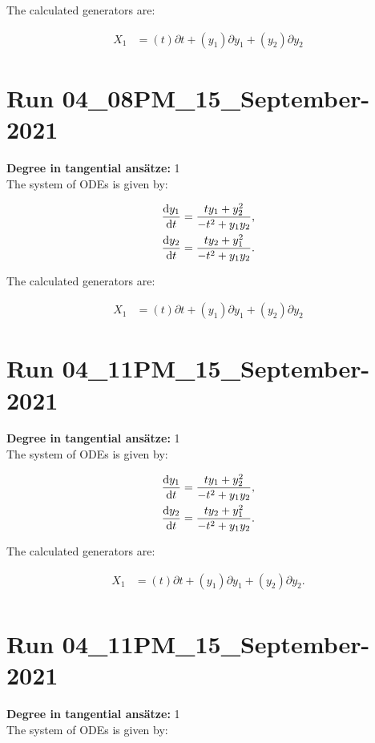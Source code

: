 \noindent The calculated generators are:

\begin{align*}
X_{1}&=\left( t \right)\partial t+\left( y_{1} \right)\partial y_{1}+\left( y_{2} \right)\partial y_{2}\end{align*}
\section*{Run 04\_08PM\_15\_September-2021}
\textbf{Degree in tangential ansätze:}	1\\
The system of ODEs is given by:

\begin{align*}
\dv{y_{1}}{t}&=\frac{t y_{1} + y_{2}^{2}}{- t^{2} + y_{1} y_{2}},\\
\dv{y_{2}}{t}&=\frac{t y_{2} + y_{1}^{2}}{- t^{2} + y_{1} y_{2}}.\\
\end{align*}

\noindent The calculated generators are:

\begin{align*}
X_{1}&=\left( t \right)\partial t+\left( y_{1} \right)\partial y_{1}+\left( y_{2} \right)\partial y_{2}
\end{align*}
\section*{Run 04\_11PM\_15\_September-2021}
\textbf{Degree in tangential ansätze:}	1\\
The system of ODEs is given by:

\begin{align*}
\dv{y_{1}}{t}&=\frac{t y_{1} + y_{2}^{2}}{- t^{2} + y_{1} y_{2}},\\
\dv{y_{2}}{t}&=\frac{t y_{2} + y_{1}^{2}}{- t^{2} + y_{1} y_{2}}.\\
\end{align*}

\noindent The calculated generators are:

\begin{align*}
X_{1}&=\left( t \right)\partial t+\left( y_{1} \right)\partial y_{1}+\left( y_{2} \right)\partial y_{2}.\\
\end{align*}
\section*{Run 04\_11PM\_15\_September-2021}
\textbf{Degree in tangential ansätze:}	1\\
The system of ODEs is given by:

